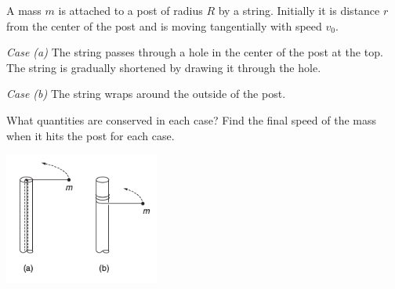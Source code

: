 \documentclass[12pt,letterpaper]{hmcpset}
\begin{document}
\begin{solution}
    \vfill
\end{solution}
\clearpage

\begin{problem}
    A mass $m$ is attached to a post of radius $R$
    by a string. Initially it is distance $r$ from
    the center of the post and is moving tangentially
    with speed $v_{0}$.

    \emph{Case (a)} The string passes through a hole
    in the center of the post at the top. The string
    is gradually shortened by drawing it through the hole.

    \emph{Case (b)} The string wraps around the outside
    of the post.

    What quantities are conserved in each case? Find
    the final speed of the mass when it hits the post
    for each case.

    \begin{center}
        \includegraphics[width=2in]{img/7_13}
    \end{center}
\end{problem}

\begin{solution}
    \vfill
\end{solution}
\clearpage
\end{document}
